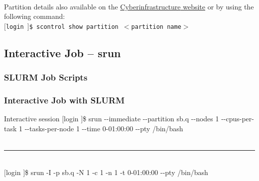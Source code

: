 \documentclass[t,hyperref={pdfpagelabels=false}]{beamer}
\newcommand{\ctilde}{{\fontfamily{ptm}\selectfont\texttildelow}}
\newcommand{\ddash}{-{}-}
\newcommand{\ci}{Cyberinfrastructure}
\begin{document}
\begin{frame}
{\begin{tabular}{l || c || c || c || c || c || c}
\bottomrule 
\end{tabular}   
}
\\
\bigskip
Partition details also available on the \href{http://www.hawaii.edu/its/ci/hpc-resources/slurm-partitions/}{{\ci} website} or by using the following command:
\\
\texttt{$[$login \ctilde$]$\$ scontrol show partition $<$partition name$>$}
\end{frame}

\subsection{Interactive Job -- srun}
\frametitle{SLURM Job Scripts}
\begin{frame}
\frametitle{Interactive Job with SLURM}
	\begin{block}{Interactive session}\tiny
	$[$login \ctilde$]$\$ srun \ddash{}immediate \ddash{}partition sb.q \ddash{}nodes 1 \ddash{}cpus-per-task 1 \ddash{}tasks-per-node 1 \ddash{}time 0-01:00:00 \ddash{}pty /bin/bash
          ~\\
          ~\\
          \hrule
          ~\\
	$[$login \ctilde$]$\$ srun -I -p sb.q -N 1 -c 1 -n 1 -t 0-01:00:00 \ddash{}pty /bin/bash

	\end{block}
\end{frame}
\end{document}
